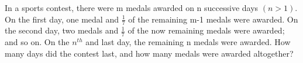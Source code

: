 \item In a sports contest, there were m medals awarded on n successive days $(n>1)$. On the first day, one medal and $\frac{1}{7}$ of the remaining m-1 medals were awarded. On the second day, two medals and $\frac{1}{7}$ of the now remaining medals were awarded; and so on. On the $n^{th}$ and last day, the remaining n medals were awarded. How many days did the contest last, and how many medals were awarded altogether?

